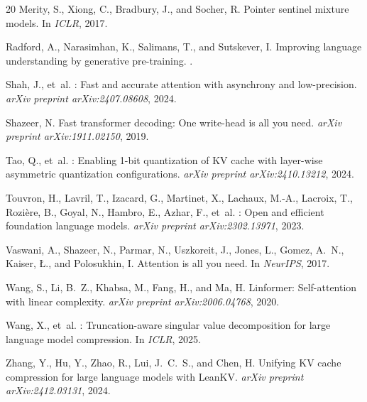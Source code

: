 \documentclass{article} %
\begin{document}
\begin{thebibliography}{20}
Merity, S., Xiong, C., Bradbury, J., and Socher, R.
\newblock Pointer sentinel mixture models.
\newblock In \emph{ICLR}, 2017.

Radford, A., Narasimhan, K., Salimans, T., and Sutskever, I.
\newblock Improving language understanding by generative pre-training.
.

Shah, J., et~al.
: Fast and accurate attention with asynchrony and low-precision.
\newblock \emph{arXiv preprint arXiv:2407.08608}, 2024.

Shazeer, N.
\newblock Fast transformer decoding: One write-head is all you need.
\newblock \emph{arXiv preprint arXiv:1911.02150}, 2019.

Tao, Q., et~al.
: Enabling 1-bit quantization of {KV} cache with layer-wise asymmetric quantization configurations.
\newblock \emph{arXiv preprint arXiv:2410.13212}, 2024.

Touvron, H., Lavril, T., Izacard, G., Martinet, X., Lachaux, M.-A., Lacroix, T., Rozi{\`e}re, B., Goyal, N., Hambro, E., Azhar, F., et~al.
: Open and efficient foundation language models.
\newblock \emph{arXiv preprint arXiv:2302.13971}, 2023.

Vaswani, A., Shazeer, N., Parmar, N., Uszkoreit, J., Jones, L., Gomez, A.~N., Kaiser, {\L}., and Polosukhin, I.
\newblock Attention is all you need.
\newblock In \emph{NeurIPS}, 2017.

Wang, S., Li, B.~Z., Khabsa, M., Fang, H., and Ma, H.
\newblock Linformer: Self-attention with linear complexity.
\newblock \emph{arXiv preprint arXiv:2006.04768}, 2020.

Wang, X., et~al.
: Truncation-aware singular value decomposition for large language model compression.
\newblock In \emph{ICLR}, 2025.

Zhang, Y., Hu, Y., Zhao, R., Lui, J.~C.~S., and Chen, H.
\newblock Unifying {KV} cache compression for large language models with {LeanKV}.
\newblock \emph{arXiv preprint arXiv:2412.03131}, 2024.


\end{thebibliography}
\end{document}
